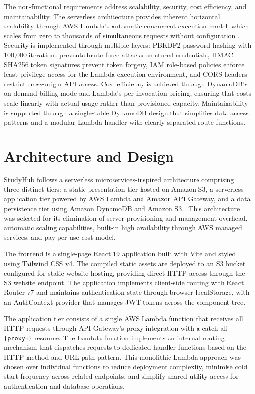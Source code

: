 \documentclass[conference]{IEEEtran}
\begin{document}
The non-functional requirements address scalability, security, cost efficiency, and maintainability. The serverless architecture provides inherent horizontal scalability through AWS Lambda's automatic concurrent execution model, which scales from zero to thousands of simultaneous requests without configuration \cite{awslambda}. Security is implemented through multiple layers: PBKDF2 password hashing with 100,000 iterations prevents brute-force attacks on stored credentials, HMAC-SHA256 token signatures prevent token forgery, IAM role-based policies enforce least-privilege access for the Lambda execution environment, and CORS headers restrict cross-origin API access. Cost efficiency is achieved through DynamoDB's on-demand billing mode and Lambda's per-invocation pricing, ensuring that costs scale linearly with actual usage rather than provisioned capacity. Maintainability is supported through a single-table DynamoDB design that simplifies data access patterns and a modular Lambda handler with clearly separated route functions.

\section{Architecture and Design}

StudyHub follows a serverless microservices-inspired architecture comprising three distinct tiers: a static presentation tier hosted on Amazon S3, a serverless application tier powered by AWS Lambda and Amazon API Gateway, and a data persistence tier using Amazon DynamoDB and Amazon S3 \cite{cloudpatterns}. This architecture was selected for its elimination of server provisioning and management overhead, automatic scaling capabilities, built-in high availability through AWS managed services, and pay-per-use cost model.

The frontend is a single-page React 19 application built with Vite and styled using Tailwind CSS v4. The compiled static assets are deployed to an S3 bucket configured for static website hosting, providing direct HTTP access through the S3 website endpoint. The application implements client-side routing with React Router v7 and maintains authentication state through browser localStorage, with an AuthContext provider that manages JWT tokens across the component tree.

The application tier consists of a single AWS Lambda function that receives all HTTP requests through API Gateway's proxy integration with a catch-all \texttt{\{proxy+\}} resource. The Lambda function implements an internal routing mechanism that dispatches requests to dedicated handler functions based on the HTTP method and URL path pattern. This monolithic Lambda approach was chosen over individual functions to reduce deployment complexity, minimise cold start frequency across related endpoints, and simplify shared utility access for authentication and database operations.
\end{document}
